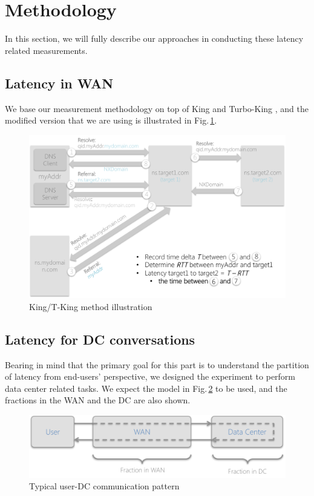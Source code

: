
\section{Methodology}
\label{sec:methodology}
In this section, we will fully describe our approaches in conducting these latency related measurements.

\subsection{Latency in WAN}
\label{sec:latency-wan}
We base our measurement methodology on top of King \cite{gummadi2002king} and Turbo-King \cite{leonard2008turbo}, and the modified version that we are using is illustrated in Fig.\,\ref{fig:king_model}.

\begin{figure}
  \centering
  \includegraphics[width=\linewidth]{../figs/king_model.pdf}
  \caption{King/T-King method illustration}
  \label{fig:king_model}
\end{figure}

\subsection{Latency for DC conversations}
\label{sec:latency-dc-conv}
Bearing in mind that the primary goal for this part is to understand the partition of latency from end-users' perspective, we designed the experiment to perform data center related tasks. We expect the model in Fig.\,\ref{fig:DC_model} to be used, and the fractions in the WAN and the DC are also shown. 

\begin{figure}
  \centering
  \includegraphics[width=\linewidth]{../figs/DC_model.pdf}
  \caption{Typical user-DC communication pattern}
  \label{fig:DC_model}
\end{figure}

